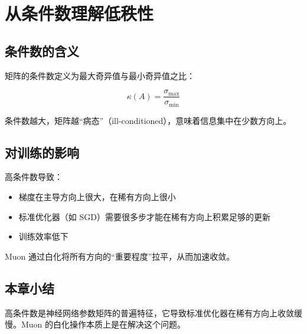 \section{从条件数理解低秩性}

\subsection{条件数的含义}

矩阵的条件数定义为最大奇异值与最小奇异值之比：

$$
\kappa(A) = \frac{\sigma_{\max}}{\sigma_{\min}}
$$

条件数越大，矩阵越``病态''（ill-conditioned），意味着信息集中在少数方向上。

\subsection{对训练的影响}

高条件数导致：
\begin{itemize}
  \item 梯度在主导方向上很大，在稀有方向上很小
  \item 标准优化器（如 SGD）需要很多步才能在稀有方向上积累足够的更新
  \item 训练效率低下
\end{itemize}

Muon 通过白化将所有方向的``重要程度''拉平，从而加速收敛。

\subsection{本章小结}

高条件数是神经网络参数矩阵的普遍特征，它导致标准优化器在稀有方向上收敛缓慢。Muon 的白化操作本质上是在解决这个问题。

